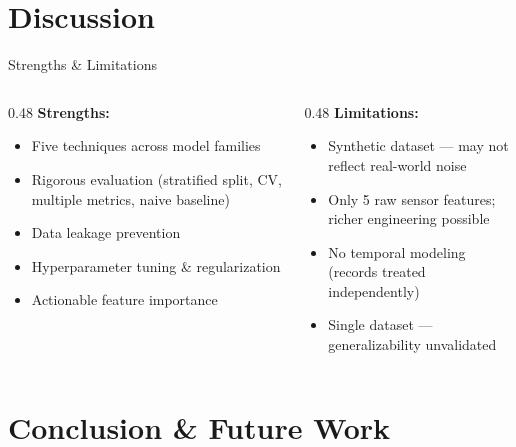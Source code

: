\documentclass[aspectratio=169]{beamer}
\begin{document}
\section{Discussion}

\begin{frame}{Strengths \& Limitations}
\begin{columns}[T]
\begin{column}{0.48\textwidth}
\textbf{Strengths:}
\begin{itemize}
    \item Five techniques across model families
    \item Rigorous evaluation (stratified split, CV, multiple metrics, naive baseline)
    \item Data leakage prevention
    \item Hyperparameter tuning \& regularization
    \item Actionable feature importance
\end{itemize}
\end{column}
\begin{column}{0.48\textwidth}
\textbf{Limitations:}
\begin{itemize}
    \item Synthetic dataset --- may not reflect real-world noise
    \item Only 5 raw sensor features; richer engineering possible
    \item No temporal modeling (records treated independently)
    \item Single dataset --- generalizability unvalidated
\end{itemize}
\end{column}
\end{columns}
\end{frame}

\section{Conclusion \& Future Work}
\end{document}

